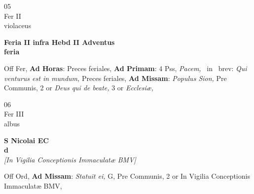 \documentclass[10pt, openany]{book}
\begin{document}
        \begin{center}
            \begin{minipage}{3.5in}
                \vspace{2em}
                \begin{minipage}{0.5in}
                    {\Huge 05} \\
                    {\normalsize Fer II} \\
                    {\normalsize violaceus}
                \end{minipage}
                \begin{minipage}{3.0in}
                    \textbf{ \large Feria II infra Hebd II Adventus \\
                    \textnormal{\normalsize feria}} \\ 
                \end{minipage}
                \begin{justify}Off Fer, \textbf{Ad Horas}: Preces feriales, \textbf{Ad Primam}: 4 Pss, \textit{Pacem,} \Vbar\ in \Rbar\ brev: \textit{Qui venturus est in mundum,} Preces feriales, \textbf{Ad Missam}: \textit{Populus Sion,} Pre Communis, 2 or \textit{Deus qui de beate,} 3 or \textit{Ecclesiæ,}   
                \end{justify}
            \end{minipage}
        \end{center}
    
        \begin{center}
            \begin{minipage}{3.5in}
                \vspace{2em}
                \begin{minipage}{0.5in}
                    {\Huge 06} \\
                    {\normalsize Fer III} \\
                    {\normalsize albus}
                \end{minipage}
                \begin{minipage}{3.0in}
                    \textbf{ \large S Nicolai EC \\
                    \textnormal{\normalsize d}} \\ \textit{[In Vigilia Conceptionis Immaculatæ BMV]} \\ 
                \end{minipage}
                \begin{justify}Off Ord, \textbf{Ad Missam}: \textit{Statuit ei,} G, Pre Communis, 2 or In Vigilia Conceptionis Immaculatæ BMV,   
                \end{justify}
            \end{minipage}
        \end{center}
    
\end{document}
